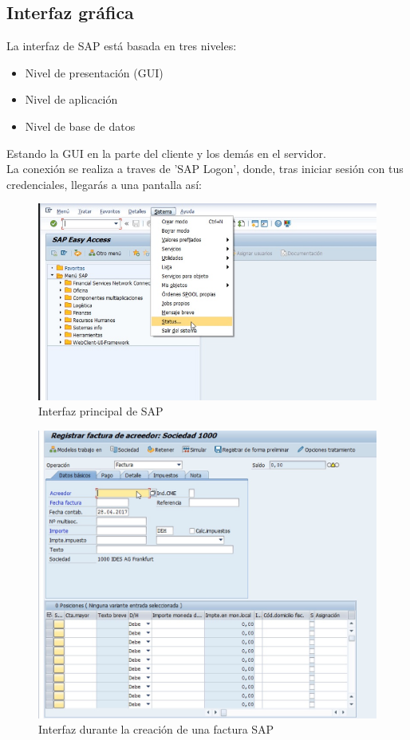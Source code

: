 \documentclass[openany,overnay,a4paper, twoside, 12pt]{book}
\begin{document}
\subsection{Interfaz gráfica}
La interfaz de SAP está basada en tres niveles: 
\begin{itemize}
    \item Nivel de presentación (GUI)
    \item Nivel de aplicación 
    \item Nivel de base de datos
\end{itemize}
Estando la GUI en la parte del cliente y los demás en el servidor.\\
La conexión se realiza a traves de 'SAP Logon', donde, tras iniciar sesión con tus credenciales, llegarás a una pantalla así:
\newpage
\begin{figure}
    \centering
    \includegraphics[scale=0.40]{sgeI/SAP.jpg}
    \caption{Interfaz principal de SAP}
    \label{fig:my_label}
\end{figure}
\begin{figure}[b]
    \centering
    \includegraphics[scale=0.25]{sgeI/FacturaSAP.jpg}
    \caption{Interfaz durante la creación de una factura SAP}
    \label{fig:my_label}
\end{figure}
\setcounter{chapter}{2}
\end{document}
